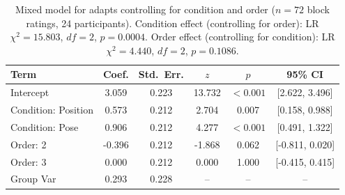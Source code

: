 \begin{table}[htbp]
\centering
\caption{Mixed model for adapts controlling for condition and order ($n = 72$ block ratings, 24 participants). Condition effect (controlling for order): LR $\chi^2 = 15.803$, $df = 2$, $p = 0.0004$. Order effect (controlling for condition): LR $\chi^2 = 4.440$, $df = 2$, $p = 0.1086$.}
\label{tab:mixedmodel-adapts}
\begin{tabular}{lccccc}
\toprule
Term & Coef. & Std.\ Err. & $z$ & $p$ & 95\% CI \\
\midrule
Intercept                & 3.059  & 0.223 & 13.732 & $<0.001$ & [2.622, 3.496] \\
Condition: Position      & 0.573  & 0.212 & 2.704  & 0.007    & [0.158, 0.988] \\
Condition: Pose          & 0.906  & 0.212 & 4.277  & $<0.001$ & [0.491, 1.322] \\
Order: 2                 & -0.396 & 0.212 & -1.868 & 0.062    & [-0.811, 0.020] \\
Order: 3                 & 0.000  & 0.212 & 0.000  & 1.000    & [-0.415, 0.415] \\
\midrule
Group Var                & 0.293  & 0.228 & --     & --       & -- \\
\bottomrule
\end{tabular}
\end{table}

